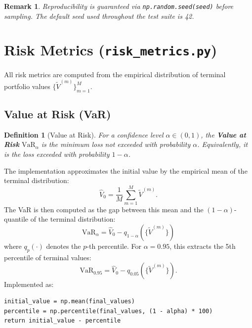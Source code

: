 \documentclass[12pt, a4paper]{article}
\newtheorem{definition}{Definition}[section]
\newtheorem{remark}{Remark}[section]
\begin{document}
\begin{remark}
    Reproducibility is guaranteed via \texttt{np.random.seed(seed)} before
    sampling. The default seed used throughout the test suite is 42.
\end{remark}

\section{Risk Metrics (\texttt{risk\_metrics.py})}

All risk metrics are computed from the empirical distribution of terminal
portfolio values $\{\widetilde{V}^{(m)}\}_{m=1}^{M}$.

\subsection{Value at Risk (VaR)}

\begin{definition}[Value at Risk]
    For a confidence level $\alpha \in (0, 1)$, the \textbf{Value at Risk}
    $\mathrm{VaR}_\alpha$ is the minimum loss not exceeded with probability
    $\alpha$. Equivalently, it is the loss exceeded with probability $1-\alpha$.
\end{definition}

The implementation approximates the initial value by the empirical mean of the
terminal distribution:
\begin{equation}
    \hat{V}_0 = \frac{1}{M}\sum_{m=1}^{M}\widetilde{V}^{(m)}.
\end{equation}
The VaR is then computed as the gap between this mean and the
$(1-\alpha)$-quantile of the terminal distribution:
\begin{equation}
    \boxed{\mathrm{VaR}_\alpha = \hat{V}_0 - q_{1-\alpha}\!\left(\{\widetilde{V}^{(m)}\}\right)}
    \label{eq:var}
\end{equation}
where $q_p(\cdot)$ denotes the $p$-th percentile. For $\alpha = 0.95$, this
extracts the 5th percentile of terminal values:
\[
    \mathrm{VaR}_{0.95} = \hat{V}_0 - q_{0.05}\!\left(\{\widetilde{V}^{(m)}\}\right).
\]
Implemented as:
\begin{lstlisting}
initial_value = np.mean(final_values)
percentile = np.percentile(final_values, (1 - alpha) * 100)
return initial_value - percentile
\end{lstlisting}
\end{document}
